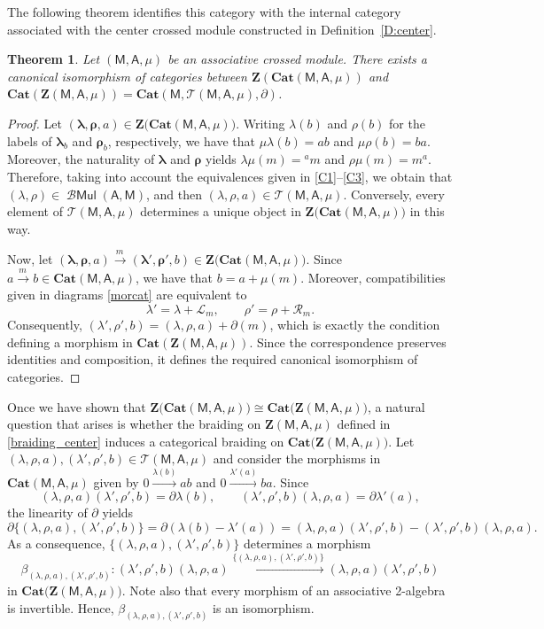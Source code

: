\documentclass[12pt,reqno]{amsart}
\theoremstyle{plain}
\newtheorem{theorem}{Theorem}[section]
\theoremstyle{definition}
\theoremstyle{remark}
\newcommand{\A}{\ensuremath{\mathsf{A}}}
\newcommand{\MM}{\ensuremath{\mathsf{M}}}
\newcommand{\ZC}{\ensuremath{\mathbf{Z}}}
\newcommand{\T}{\ensuremath{\mathcal{T}}}
\newcommand{\Cat}{\ensuremath{\mathbf{Cat}}}
\newcommand{\LL}{\ensuremath{\mathcal{L}}}
\newcommand{\RR}{\ensuremath{\mathcal{R}}}
\DeclareMathOperator{\Mul}{\mathcal{B}\ensuremath{\mathsf{Mul}}}
\numberwithin{equation}{section}
\begin{document}
The following theorem identifies this category with the internal category associated with the center crossed module constructed in Definition~\ref{D:center}.

\begin{theorem}
	Let $(\MM,\A,\mu)$ be an associative crossed module. There exists a canonical isomorphism of categories between $\ZC(\Cat(\MM,\A,\mu))$ and $\Cat(\ZC(\MM,\A,\mu))=\Cat(\MM,\T(\MM,\A,\mu),\partial)$.
\end{theorem}
\begin{proof}
	Let $(\boldsymbol{\lambda} ,\boldsymbol{\rho},a)\in \ZC\big(\Cat(\MM,\A,\mu)\big)$. Writing $\lambda(b)$ and 
	$\rho(b)$ for the labels of $\boldsymbol{\lambda} _{b}$ and $\boldsymbol{\rho}_{b}$, respectively,
	 we have that $\mu\lambda(b)=ab$ and $\mu\rho(b)=ba$. Moreover, the naturality of $\boldsymbol{\lambda} $
	  and $\boldsymbol{\rho}$ yields $\lambda\mu(m)={}^{a}m$ and $\rho\mu(m)=m^{a}$.
	   Therefore, taking into account the equivalences given in \eqref{C1}--\eqref{C3},
	    we obtain that $(\lambda,\rho)\in\Mul(\A,\MM)$, and then $(\lambda,\rho, a)\in \T(\MM,\A,\mu)$. 
	    Conversely, every element of $\T(\MM,\A,\mu)$ determines a unique object in $\ZC\big(\Cat(\MM,\A,\mu)\big)$ in this way.
	
	Now, let $(\boldsymbol{\lambda} ,\boldsymbol{\rho},a)\xrightarrow{m \,}(\boldsymbol{\lambda} ',\boldsymbol{\rho}',b)\in \ZC\big(\Cat(\MM,\A,\mu)\big)$.
	 Since $a\xrightarrow{m\, }b\in \Cat(\MM,\A,\mu)$, we have that $b=a+\mu(m)$. Moreover, compatibilities given in diagrams \eqref{morcat}
	are equivalent to
	\[\lambda'=\lambda+\LL_{m},\qquad \rho'=\rho+\RR_{m}.\]
	Consequently, $(\lambda',\rho',b)=(\lambda,\rho,a)+\partial(m)$, which is exactly the condition defining a morphism in $\Cat(\ZC(\MM,\A,\mu))$.
	 Since the correspondence preserves identities and composition, it defines the required canonical isomorphism of categories.
\end{proof}

Once we have shown that $\ZC\big(\Cat(\MM,\A,\mu)\big)\cong \Cat\big(\ZC(\MM,\A,\mu)\big)$, a natural question that arises is whether the braiding on 
$\ZC(\MM,\A,\mu)$ defined in \eqref{braiding_center} induces a categorical braiding on $\Cat\big(\ZC(\MM,\A,\mu)\big)$. 
Let $(\lambda,\rho,a),(\lambda',\rho',b)\in\T(\MM,\A,\mu)$ and consider the morphisms in $\Cat(\MM,\A,\mu)$ given by $0\xrightarrow{\lambda(b)}ab$ and $0\xrightarrow{\lambda'(a)}ba$. Since
\[(\lambda,\rho,a)(\lambda',\rho',b)=\partial\lambda(b), \qquad(\lambda',\rho',b)(\lambda,\rho,a)=\partial\lambda'(a),\]
the linearity of $\partial$ yields \[\partial\{(\lambda,\rho,a),(\lambda',\rho',b)\}=\partial(\lambda(b)-\lambda'(a))=(\lambda,\rho,a)(\lambda',\rho',b)-(\lambda',\rho',b)(\lambda,\rho,a).\]
As a consequence, $\{(\lambda,\rho,a),(\lambda',\rho',b)\}$ determines a morphism
\[\beta_{(\lambda,\rho,a),(\lambda',\rho',b)}\colon (\lambda',\rho',b)(\lambda,\rho,a)\xrightarrow{\{(\lambda,\rho,a),(\lambda',\rho',b)\}}(\lambda,\rho,a)(\lambda',\rho',b)\]
in $\Cat\big(\ZC(\MM,\A,\mu)\big)$. Note also that every morphism of an associative 2-algebra is invertible. Hence, $\beta_{(\lambda,\rho,a),(\lambda',\rho',b)}$ is an isomorphism.
\end{document}
